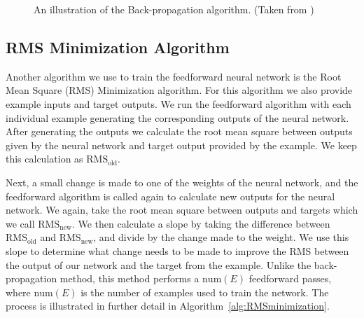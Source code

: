 \documentclass[11pt]{article}
\begin{document}
\begin{figure}[]
		\caption{An illustration of the Back-propagation algorithm. (Taken from \cite{vlsibackp_t})}
	\label{fig:figures_backpgtn}	
\end{figure}


\subsection{RMS Minimization Algorithm} %
\label{sub:rms_minimization_algorithm}

Another algorithm we use to train the feedforward neural network is the Root Mean Square (RMS) Minimization algorithm. For this
algorithm we also provide example inputs and target outputs. We run the feedforward algorithm with each individual example generating
the corresponding outputs of the neural network. After generating the outputs we calculate the root mean square between outputs given by
the neural network and target output provided by the example. We keep this calculation as $\mbox{RMS}_{\mbox{old}}$.

Next, a small change is made to one of the weights of the neural network, and the feedforward algorithm is called again to calculate new
outputs for the neural network. We again, take the root mean square between outputs and targets which we call $\mbox{RMS}_{\mbox{new}}$.
We then calculate a slope by taking the difference between $\mbox{RMS}_{\mbox{old}}$ and $\mbox{RMS}_{\mbox{new}}$, and divide by the
change made to the weight. We use this slope to determine what change needs to be made to improve the RMS between the output of our
network and the target from the example. Unlike the back-propagation method, this method performs a $\mbox{num}(E)$ feedforward passes,
where $\mbox{num}(E)$ is the number of examples used to train the network. The process is illustrated in further detail in
Algorithm~\ref{alg:RMSminimization}.
\end{document}

